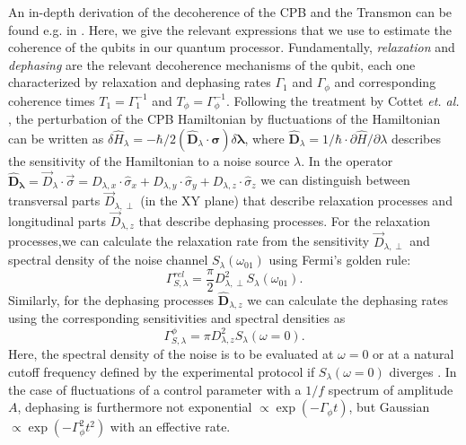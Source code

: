 An in-depth derivation of the decoherence of the CPB and the Transmon can be found e.g. in \citep{cottet_implementation_2002,koch_charge-insensitive_2007}.
 Here, we give the relevant expressions that we use to estimate the coherence of the qubits in our quantum processor. Fundamentally, {\it relaxation} and {\it dephasing} are the relevant
 decoherence mechanisms of the qubit, each one characterized by relaxation and dephasing rates $\Gamma_1$ and $\Gamma_\phi$ and corresponding coherence times $T_1=\Gamma_1^{-1}$ 
and $T_\phi=\Gamma_\phi^{-1}$. Following the treatment by Cottet {\it et. al.} \citep{cottet_implementation_2002}, the perturbation of the CPB Hamiltonian by fluctuations of the Hamiltonian can be written
 as $\delta \hat{H}_{\lambda}=-\hbar/2(\mathbf{\hat{D}}_\lambda\cdot\mathbf{\sigma})\delta \mathbf{\lambda}$, where $\mathbf{\hat{D}}_\lambda=1/\hbar\cdot \partial \hat{H}/\partial \lambda$ describes
 the sensitivity of the Hamiltonian to a noise source $\lambda$.
 In the operator $\mathbf{\hat{D}_\lambda}=\vec{D}_\lambda\cdot \vec{\sigma}=D_{\lambda,x}\cdot\hat{\sigma}_x+D_{\lambda,y}\cdot\hat{\sigma}_y+D_{\lambda,z}\cdot\hat{\sigma}_z$ we
 can distinguish between transversal parts $\vec{D}_{\lambda,\perp}$ (in the XY plane) that describe relaxation processes and longitudinal parts $\vec{D}_{\lambda,z}$ that describe 
dephasing processes. For the relaxation processes,we can calculate the relaxation rate from the sensitivity $\vec{D}_{\lambda,\perp}$ and spectral density of the noise channel
 $S_{\lambda}(\omega_{01})$ using Fermi's golden rule:
%
\begin{equation}
\Gamma^{rel}_{S,\lambda} = \frac{\pi}{2}D_{\lambda,\perp}^2 S_{\lambda}(\omega_{01}). \label{eq:relaxation_rate}
\end{equation}
%
Similarly, for the dephasing processes $\hat{\mathbf{D}}_{\lambda,z}$ we can calculate the dephasing rates using the corresponding sensitivities and spectral densities as
%
\begin{equation}
\Gamma_{S,\lambda}^\phi = \pi D_{\lambda,z}^2 S_{\lambda}(\omega = 0).
\end{equation}
% 
Here, the spectral density of the noise is to be evaluated at $\omega=0$ or at a natural cutoff frequency defined by the experimental protocol if $S_{\lambda}(\omega=0)$ diverges \citep{cottet_implementation_2002}. 
In the case of fluctuations of a control parameter with a  $1/f$ spectrum of amplitude $A$, dephasing is furthermore not exponential $\propto\exp{(-\Gamma_\phi t)}$, but Gaussian $\propto\exp{(-\Gamma_\phi^2 t^2)}$ with an effective rate. 
